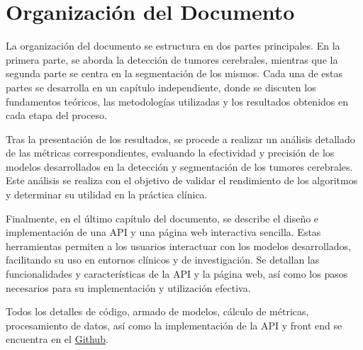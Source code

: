 \section{Organización del Documento}

La organización del documento se estructura en dos partes principales. En la primera parte, se aborda la detección de tumores cerebrales, mientras que la segunda parte se centra en la segmentación de los mismos. Cada una de estas partes se desarrolla en un capítulo independiente, donde se discuten los fundamentos teóricos, las metodologías utilizadas y los resultados obtenidos en cada etapa del proceso.

Tras la presentación de los resultados, se procede a realizar un análisis detallado de las métricas correspondientes, evaluando la efectividad y precisión de los modelos desarrollados en la detección y segmentación de los tumores cerebrales. Este análisis se realiza con el objetivo de validar el rendimiento de los algoritmos y determinar su utilidad en la práctica clínica.

Finalmente, en el último capítulo del documento, se describe el diseño e implementación de una API y una página web interactiva sencilla. Estas herramientas permiten a los usuarios interactuar con los modelos desarrollados, facilitando su uso en entornos clínicos y de investigación. Se detallan las funcionalidades y características de la API y la página web, así como los pasos necesarios para su implementación y utilización efectiva.

Todos los detalles de código, armado de modelos, cálculo de métricas, procesamiento de datos, así como la implementación de la API y front end se encuentra en el \href{https://github.com/carlosng95/UCM-TFM}{Github}.






